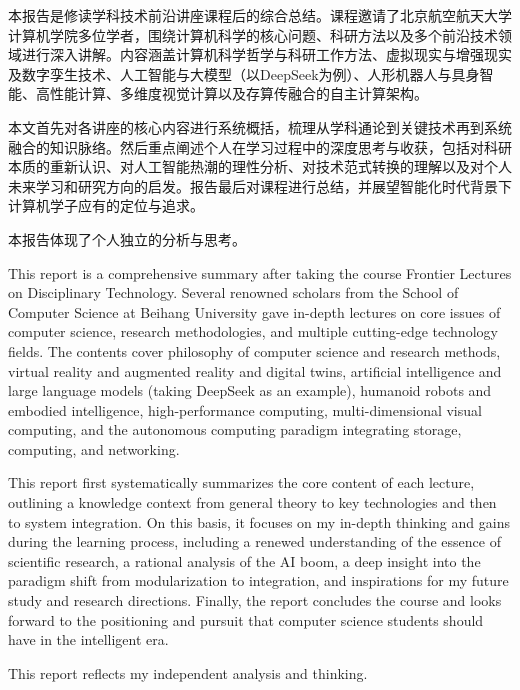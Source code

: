 \begin{cabstract}
本报告是修读学科技术前沿讲座课程后的综合总结。课程邀请了北京航空航天大学计算机学院多位学者，围绕计算机科学的核心问题、科研方法以及多个前沿技术领域进行深入讲解。内容涵盖计算机科学哲学与科研工作方法、虚拟现实与增强现实及数字孪生技术、人工智能与大模型（以DeepSeek为例）、人形机器人与具身智能、高性能计算、多维度视觉计算以及存算传融合的自主计算架构。

本文首先对各讲座的核心内容进行系统概括，梳理从学科通论到关键技术再到系统融合的知识脉络。然后重点阐述个人在学习过程中的深度思考与收获，包括对科研本质的重新认识、对人工智能热潮的理性分析、对技术范式转换的理解以及对个人未来学习和研究方向的启发。报告最后对课程进行总结，并展望智能化时代背景下计算机学子应有的定位与追求。

本报告体现了个人独立的分析与思考。
\end{cabstract}

\begin{eabstract}
This report is a comprehensive summary after taking the course Frontier Lectures on Disciplinary Technology. Several renowned scholars from the School of Computer Science at Beihang University gave in-depth lectures on core issues of computer science, research methodologies, and multiple cutting-edge technology fields. The contents cover philosophy of computer science and research methods, virtual reality and augmented reality and digital twins, artificial intelligence and large language models (taking DeepSeek as an example), humanoid robots and embodied intelligence, high-performance computing, multi-dimensional visual computing, and the autonomous computing paradigm integrating storage, computing, and networking.

This report first systematically summarizes the core content of each lecture, outlining a knowledge context from general theory to key technologies and then to system integration. On this basis, it focuses on my in-depth thinking and gains during the learning process, including a renewed understanding of the essence of scientific research, a rational analysis of the AI boom, a deep insight into the paradigm shift from modularization to integration, and inspirations for my future study and research directions. Finally, the report concludes the course and looks forward to the positioning and pursuit that computer science students should have in the intelligent era.

This report reflects my independent analysis and thinking.
\end{eabstract}

